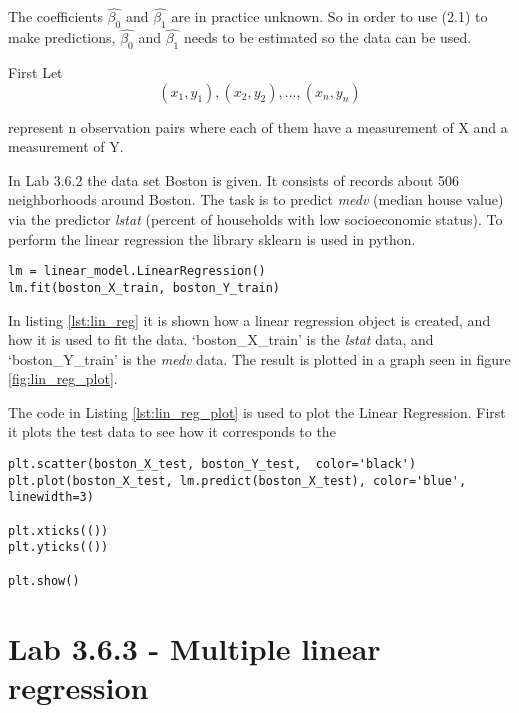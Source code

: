 The coefficients 
$\hat{\beta_0}$ and  $\hat{\beta_1}$ are in practice unknown. So in order to use (2.1) to make predictions, $\hat{\beta_0}$ and  $\hat{\beta_1}$ needs to be estimated so the data can be used. 

First Let 
\begin{equation}
(x_1, y_1), (x_2, y_2),..., (x_n, y_n)
\end{equation}

represent n observation pairs where each of them have a measurement of X and a measurement of Y.



In Lab 3.6.2 the data set Boston is given. It consists of records about 506 neighborhoods around Boston. The task is to predict \emph{medv} (median house  value) via the predictor \emph{lstat} (percent of households with low socioeconomic status).
To perform the linear regression the library sklearn is used in python. 

\lstset{}
\begin{lstlisting}[caption={Python Linear Regression function}, label=lst:lin_reg, mathescape=true]
lm = linear_model.LinearRegression()
lm.fit(boston_X_train, boston_Y_train)
\end{lstlisting}

In listing \ref{lst:lin_reg} it is shown how a linear regression object is created, and how it is used to fit the data. ‘boston\_X\_train’ is the \emph{lstat} data, and ‘boston\_Y\_train’ is the \emph{medv} data.
The result is plotted in a graph seen in figure \ref{fig:lin_reg_plot}.


The code in Listing \ref{lst:lin_reg_plot} is used to plot the Linear Regression. First it plots the test data to see how it corresponds to the  
\begin{lstlisting}[caption={Python Plotting of Linear Regression function}, label=lst:lin_reg_plot, mathescape=true]
plt.scatter(boston_X_test, boston_Y_test,  color='black')
plt.plot(boston_X_test, lm.predict(boston_X_test), color='blue',
linewidth=3)

plt.xticks(())
plt.yticks(())

plt.show()
\end{lstlisting}
 

\section{Lab 3.6.3 - Multiple linear regression}



